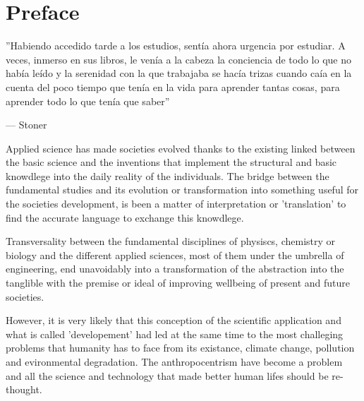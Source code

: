 \chapter*{Preface\label{cha:preface}}

\epigraphfontsize{\small\itshape}
\epigraph{''Habiendo accedido tarde a los estudios, sentía ahora urgencia por estudiar. A veces, inmerso en sus libros, le venía a la cabeza la conciencia de todo lo que no había leído y la serenidad con la que trabajaba se hacía trizas cuando caía en la cuenta del poco tiempo que tenía en la vida para aprender tantas cosas, para aprender todo lo que tenía que saber''}{--- \textup{Stoner}}

Applied science has made societies evolved thanks to the existing linked between the basic science and the inventions that implement the structural and basic knowdlege into the daily reality of the individuals. The bridge between the fundamental studies and its evolution or transformation into something useful for the societies development, is been a matter of interpretation or 'translation' to find the accurate language to exchange this knowdlege.


Transversality between the fundamental disciplines of physiscs, chemistry or biology and the different applied sciences, most of them under the umbrella of engineering, end unavoidably into a transformation of the abstraction into the tanglible with the premise or ideal of improving wellbeing of present and future societies.


However, it is very likely that this conception of the scientific application and what is called 'developement' had led at the same time to the most challeging problems that humanity has to face from its existance, climate change, pollution and evironmental degradation. The anthropocentrism have become a problem and all the science and technology that made better human lifes should be re-thought.

